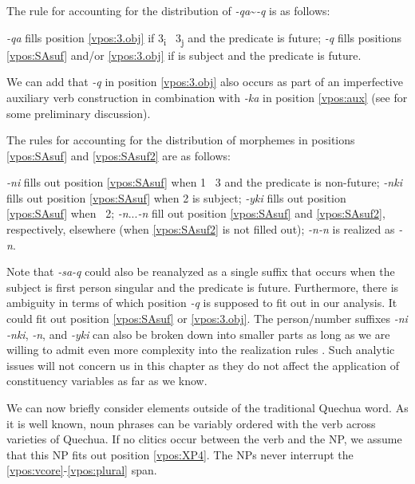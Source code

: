 \documentclass[output=paper]{langscibook}
\begin{document}
The rule for accounting for the distribution of \textit{-qa}\sim\textit{-q} is as follows:

\ea 
    \ea \textit{-qa} fills position \ref{vpos:3.obj} if 3\textsubscript{i}  \rightarrow 3\textsubscript{j} and the predicate is future;
    \ex \textit{-q} fills positions \ref{vpos:SAsuf} and/or \ref{vpos:3.obj} if \First{}\Sg{} is subject and the predicate is future.
    \z
\z 

We can add that \textit{-q} in position \ref{vpos:3.obj} also occurs as part of an imperfective auxiliary verb construction in combination with \textit{-ka} in position \ref{vpos:aux} (see  for some preliminary discussion).

The rules for accounting for the distribution of morphemes in positions \ref{vpos:SAsuf} and \ref{vpos:SAsuf2} are as follows:

\ea 
    \ea \textit{-ni} fills out position \ref{vpos:SAsuf} when 1 \rightarrow 3 and the predicate is non-future;
    \ex \textit{-nki} fills out position \ref{vpos:SAsuf} when 2 is subject;
    \ex \textit{-yki} fills out position \ref{vpos:SAsuf} when \First{}\Sg{} \rightarrow 2;
    \ex \textit{-n}...\textit{-n} fill out position \ref{vpos:SAsuf} and \ref{vpos:SAsuf2},
    respectively, elsewhere (when \ref{vpos:SAsuf2} is not filled out);
    \ex \textit{-n-n} is realized as \textit{-n}.
    \z 
\z

Note that \textit{-sa-q} could also be reanalyzed as a single suffix that occurs when the subject is first person singular and the predicate is future. Furthermore, there is ambiguity in terms of which position \textit{-q} is supposed to fit out in our analysis. It could fit out position \ref{vpos:SAsuf} or \ref{vpos:3.obj}. The person/number suffixes \textit{-ni} \textit{-nki}, \textit{-n}, and \textit{-yki} can also be broken down into smaller parts as long as we are willing to admit even more complexity into the realization rules \citep{myler2017}. Such analytic issues will not concern us in this chapter as they do not affect the application of constituency variables as far as we know.

\largerpage
We can now briefly consider elements outside of the traditional Quechua word. As it is well known, noun phrases can be variably ordered with the verb across varieties of Quechua. If no clitics occur between the verb and the NP, we assume that this NP fits out position \ref{vpos:XP4}. The NPs never interrupt the \ref{vpos:vcore}-\ref{vpos:plural} span.
\end{document}
